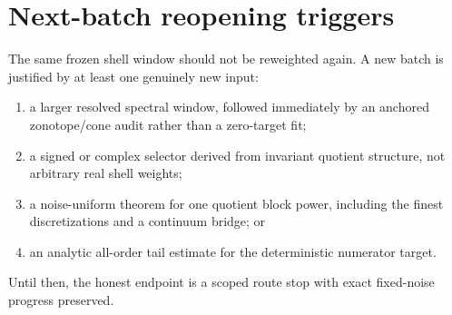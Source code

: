 \documentclass[11pt]{article}
\begin{document}
\section{Next-batch reopening triggers}

The same frozen shell window should not be reweighted again.  A new batch is
justified by at least one genuinely new input:
\begin{enumerate}
\item a larger resolved spectral window, followed immediately by an anchored
zonotope/cone audit rather than a zero-target fit;
\item a signed or complex selector derived from invariant quotient structure,
not arbitrary real shell weights;
\item a noise-uniform theorem for one quotient block power, including the
finest discretizations and a continuum bridge; or
\item an analytic all-order tail estimate for the deterministic numerator
target.
\end{enumerate}
Until then, the honest endpoint is a scoped route stop with exact
fixed-noise progress preserved.



\end{document}
